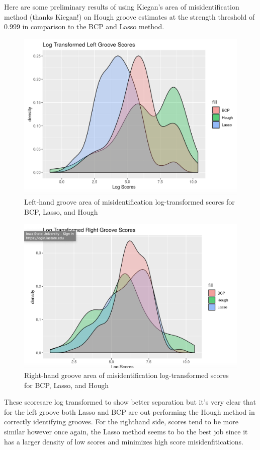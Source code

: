 \documentclass[]{book}
\begin{document}
Here are some preliminary results of using Kiegan's area of misidentification method
(thanks Kiegan!) on Hough groove estimates at the strength threshold of 0.999
in comparison to the BCP and Lasso method.

\begin{figure}

{\centering \includegraphics[width=0.5\linewidth]{images/bullets/Hough_project/preliminary_phoenix_score_results_left} 

}

\caption{Left-hand groove area of misidentification log-transformed scores for BCP, Lasso, and Hough}\label{fig:unnamed-chunk-13}
\end{figure}

\begin{figure}

{\centering \includegraphics[width=0.5\linewidth]{images/bullets/Hough_project/preliminary_phoenix_score_results_right} 

}

\caption{Right-hand groove area of misidentification log-transformed scores for BCP, Lasso, and Hough}\label{fig:unnamed-chunk-14}
\end{figure}

These scoresare log transformed to show better separation but it's very clear that for the
left groove both Lasso and BCP are out performing the Hough method in correctly identifying grooves. For the righthand side, scores tend to be more similar however once again,
the Lasso method seems to bo the best job since it has a larger density of low scores
and minimizes high score misidenfitications.
\end{document}

